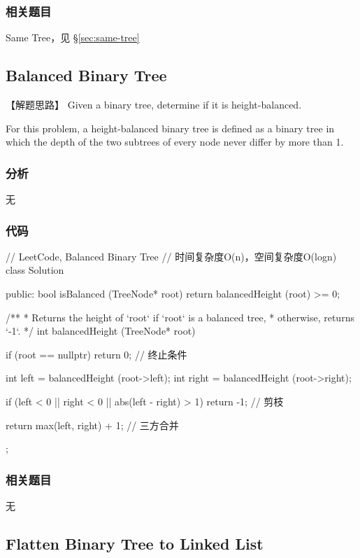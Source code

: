 \subsubsection{相关题目}
\begindot
\item Same Tree，见 \S \ref{sec:same-tree}
\myenddot


\subsection{Balanced Binary Tree}
\label{sec:balanced-binary-tree}


【解题思路】
Given a binary tree, determine if it is height-balanced.

For this problem, a height-balanced binary tree is defined as a binary tree in which the depth of the two subtrees of every node never differ by more than 1.


\subsubsection{分析}
无


\subsubsection{代码}
\begin{Code}
	// LeetCode, Balanced Binary Tree
	// 时间复杂度O(n)，空间复杂度O(logn)
	class Solution {
		public:
		bool isBalanced (TreeNode* root) {
			return balancedHeight (root) >= 0;
		}
		
		/**
		* Returns the height of `root` if `root` is a balanced tree,
		* otherwise, returns `-1`.
		*/
		int balancedHeight (TreeNode* root) {
			if (root == nullptr) return 0;  // 终止条件
			
			int left = balancedHeight (root->left);
			int right = balancedHeight (root->right);
			
			if (left < 0 || right < 0 || abs(left - right) > 1) return -1;  // 剪枝
			
			return max(left, right) + 1; // 三方合并
		}
	};
\end{Code}


\subsubsection{相关题目}
\begindot
\item 无
\myenddot


\subsection{Flatten Binary Tree to Linked List}
\label{sec:flatten-binary-tree-to-linked-list}


